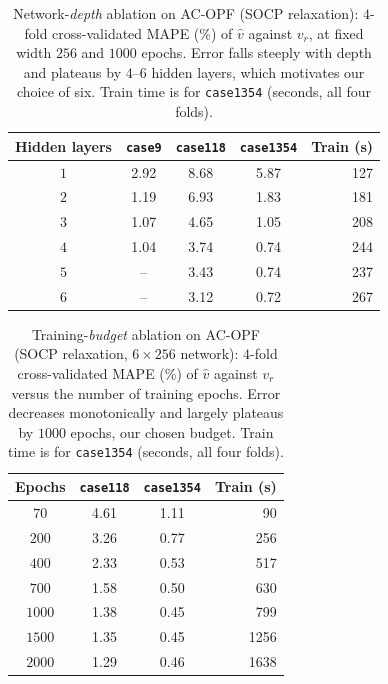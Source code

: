 \documentclass[10pt]{article} %
\theoremstyle{plain}
\theoremstyle{definition}
\theoremstyle{remark}
\begin{document}
\begin{table}[h]
\centering\footnotesize
\caption{Network-\emph{depth} ablation on AC-OPF (SOCP relaxation): $4$-fold
cross-validated MAPE (\%) of $\hat{v}$ against $v_r$, at fixed width $256$ and $1000$
epochs. Error falls steeply with depth and plateaus by $4$--$6$ hidden layers, which
motivates our choice of six. Train time is for \texttt{case1354} (seconds, all four folds).}
\label{tab:ablation-depth}
\begin{tabular}{c ccc r}
\toprule
\textbf{Hidden layers} & \texttt{case9} & \texttt{case118} & \texttt{case1354} & \textbf{Train (s)} \\
\midrule
  $1$ & 2.92 & 8.68 & 5.87 & 127 \\
  $2$ & 1.19 & 6.93 & 1.83 & 181 \\
  $3$ & 1.07 & 4.65 & 1.05 & 208 \\
  $4$ & 1.04 & 3.74 & 0.74 & 244 \\
  $5$ & -- & 3.43 & 0.74 & 237 \\
  $6$ & -- & 3.12 & 0.72 & 267 \\
\bottomrule
\end{tabular}
\end{table}

\begin{table}[h]
\centering\footnotesize
\caption{Training-\emph{budget} ablation on AC-OPF (SOCP relaxation, $6\times256$
network): $4$-fold cross-validated MAPE (\%) of $\hat{v}$ against $v_r$ versus the number
of training epochs. Error decreases monotonically and largely plateaus by $1000$ epochs,
our chosen budget. Train time is for \texttt{case1354} (seconds, all four folds).}
\label{tab:ablation-epochs}
\begin{tabular}{c cc r}
\toprule
\textbf{Epochs} & \texttt{case118} & \texttt{case1354} & \textbf{Train (s)} \\
\midrule
  $70$ & 4.61 & 1.11 & 90 \\
  $200$ & 3.26 & 0.77 & 256 \\
  $400$ & 2.33 & 0.53 & 517 \\
  $700$ & 1.58 & 0.50 & 630 \\
  $1000$ & 1.38 & 0.45 & 799 \\
  $1500$ & 1.35 & 0.45 & 1256 \\
  $2000$ & 1.29 & 0.46 & 1638 \\
\bottomrule
\end{tabular}
\end{table}
\end{document}

